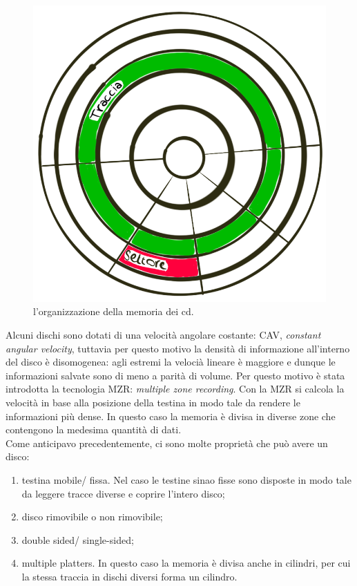 \documentclass{article}
\begin{document}
\begin{figure}[h]
	\centering
	\includegraphics[scale=0.3]{immagini/cdrom}
	\caption{l'organizzazione della memoria dei cd.}
\end{figure}

\indent Alcuni dischi sono dotati di una velocità angolare costante: CAV, \textit{constant angular velocity}, tuttavia per questo motivo la densità di informazione all'interno del disco è disomogenea: agli estremi la velocià lineare è maggiore e dunque le informazioni salvate sono di meno a parità di volume. Per questo motivo è stata introdotta la tecnologia MZR: \textit{multiple zone recording}. Con la MZR si calcola la velocità in base alla posizione della testina in modo tale da rendere le informazioni più dense. In questo caso la memoria è divisa in diverse zone che contengono la medesima quantità di dati.\\
\indent Come anticipavo precedentemente, ci sono molte proprietà che può avere un disco:
\begin{enumerate}
	\item testina mobile/ fissa. Nel caso le testine sinao fisse sono disposte in modo tale da leggere tracce diverse e coprire l'intero disco;

	\item disco rimovibile o non rimovibile;

	\item double sided/ single-sided;

	\item multiple platters. In questo caso la memoria è divisa anche in cilindri, per cui la stessa traccia in dischi diversi forma un cilindro.
\end{enumerate}
\end{document}
